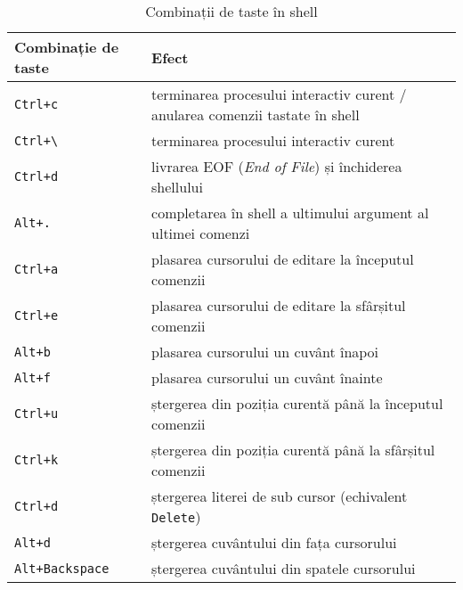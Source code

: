 \begin{table}[!htb]
  \caption{Combinații de taste în shell}
  \begin{center}
    \begin{tabular}{ p{} p{} }
      \toprule
        \textbf{Combinație de taste} &
        \textbf{Efect} \\
      \midrule
        \texttt{Ctrl+c} &
        terminarea procesului interactiv curent / anularea comenzii tastate în shell \\

        \texttt{Ctrl+\textbackslash{}} &
        terminarea procesului interactiv curent \\

        \texttt{Ctrl+d} &
        livrarea EOF (\textit{End of File}) și închiderea shellului \\

        \texttt{Alt+.} &
        completarea în shell a ultimului argument al ultimei comenzi \\

        \texttt{Ctrl+a} &
        plasarea cursorului de editare la începutul comenzii \\

        \texttt{Ctrl+e} &
        plasarea cursorului de editare la sfârșitul comenzii \\

        \texttt{Alt+b} &
        plasarea cursorului un cuvânt înapoi \\

        \texttt{Alt+f} &
        plasarea cursorului un cuvânt înainte \\

        \texttt{Ctrl+u} &
        ștergerea din poziția curentă până la începutul comenzii \\

        \texttt{Ctrl+k} &
        ștergerea din poziția curentă până la sfârșitul comenzii \\

        \texttt{Ctrl+d} &
        ștergerea literei de sub cursor (echivalent \texttt{Delete}) \\

        \texttt{Alt+d} &
        ștergerea cuvântului din fața cursorului \\

        \texttt{Alt+Backspace} &
        ștergerea cuvântului din spatele cursorului \\
      \bottomrule
    \end{tabular}
    \label{tab:cli:key-bindings}
  \end{center}
\end{table}

